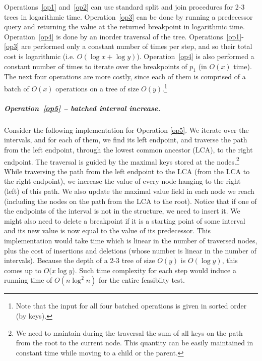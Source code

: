 \documentclass[a4paper,UKenglish]{lipics-v2016}
\theoremstyle{plain}
\renewcommand{\paragraph}{\subparagraph}
\begin{document}
 Operations~\ref{op1} and~\ref{op2} can use standard split and join procedures for 2-3 trees in logarithmic time. 
 Operation~\ref{op3} can be done by running a predecessor query and returning the value at the returned breakpoint in logarithmic time.
 Operation~\ref{op4} is done by an inorder traversal of the tree. 
Operations~\ref{op1}-\ref{op3} are performed only a constant number of times per step, and so their total cost is logarithmic (i.e. $O(\log x + \log y)$). Operation~\ref{op4} is also performed a constant number of times to iterate over the breakpoints of $p_{1}$ (in $O(x)$ time). The next four operations are more costly, since each of them is comprised of a batch of $O(x)$ operations on a tree of size $O(y)$.\footnote{Note that the input for all four batched operations is given in sorted order (by keys).}


\paragraph{Operation~\ref{op5} -- batched interval increase.}
Consider the following implementation for Operation \ref{op5}. We iterate over the intervals, and for each of them, we find its left endpoint, and traverse the path from the left endpoint, through the lowest common ancestor (LCA), to the right endpoint.
The traversal is guided by the maximal keys stored at the nodes.\footnote{We need to maintain during the traversal the sum of all keys on the path from the root to the current node. This quantity can be easily maintained in constant time while moving to a child or the parent.}
While traversing the path from the left endpoint to the LCA (from the LCA to the right endpoint), we increase the value of every node hanging to the right (left) of this path. We also update the maximal value field in each node we reach (including the nodes on the path from the LCA to the root). Notice that if one of the endpoints of the interval is not in the structure, we need to insert it. We might also need to delete a breakpoint if it is a starting point of some interval and its new value is now equal to the value of its predecessor. This implementation would take time which is linear in the number of traversed nodes, plus the cost of insertions and deletions (whose number is linear in the number of intervals). Because the depth of a 2-3 tree of size $O(y)$ is $O(\log y)$, this comes up to $O(x \log y$). Such time complexity for each step would induce a running time of $O(n \log ^2 n)$ for the entire feasibilty test. 
\end{document}
